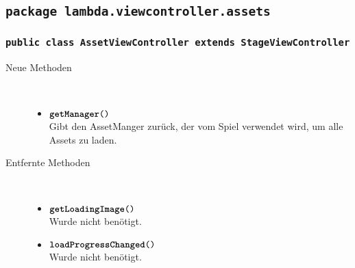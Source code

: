 \subsection{\texttt{package lambda.viewcontroller.assets}}

\subsubsection{\normalfont \texttt{public class \textbf{AssetViewController} extends StageViewController}}

\begin{description}
\item[Neue Methoden] \hfill \\
	\vspace{-.8cm}
	\begin{itemize}
		\item $\texttt{\textbf{getManager}()}$ \\ Gibt den AssetManger zurück, der vom Spiel verwendet wird, um alle Assets zu laden.
	\end{itemize}
	
\item[Entfernte Methoden] \hfill \\
	\vspace{-.8cm}
	\begin{itemize}
		\item $\texttt{\textbf{getLoadingImage}()}$ \\ Wurde nicht benötigt.
		\item $\texttt{\textbf{loadProgressChanged}()}$ \\ Wurde nicht benötigt.
	\end{itemize}
\end{description}
